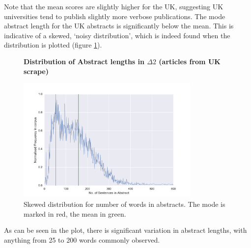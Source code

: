 Note that the mean scores are slightly higher for the UK, suggesting UK universities tend to publish slightly more verbose publications. The mode abstract length for the UK abstracts is significantly below the mean. This is indicative of a skewed, `noisy distribution', which is indeed found when the distribution is plotted (figure \ref{fig:abstract_sens}).
 \begin{figure}[H]
    \centering
    \textbf{Distribution of Abstract lengths in $\Delta2$ (articles from UK scrape)}\par\medskip
    \includegraphics[width=0.8\textwidth]{Appendix/Data_Acquisition/abstracts.png}
    \caption[Distribution of Abstract lengths in $\Delta2$ (Articles from UK)]{Skewed distribution for number of words in abstracts. The mode is marked in red, the mean in green.}
     \label{fig:abstract_sens}
\end{figure}
As can be seen in the plot, there is significant variation in abstract lengths, with anything from 25 to 200 words commonly observed.
\label{sec:SCRAPEANALYSIS}


